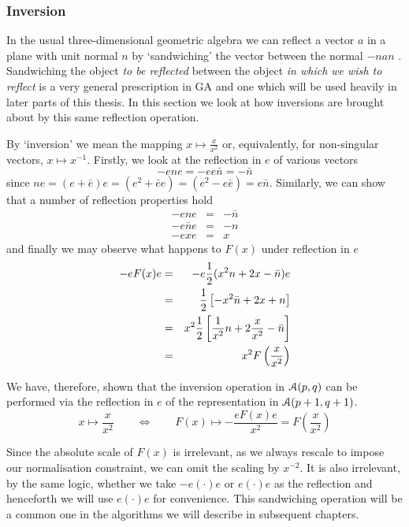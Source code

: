 \subsubsection{Inversion}

In the usual three-dimensional geometric algebra we can reflect a vector $a$
in a plane with unit normal $n$ by `sandwiching' the vector between the
normal $-nan$ \cite{IJCV98}. Sandwiching the object \emph{to be reflected}
between the object \emph{in which we wish to reflect} is a very general
prescription in GA and one which will be used heavily in later parts of this
thesis.  In this section we look at how inversions are brought about by this
same reflection operation.

By `inversion' we mean the mapping $x \mapsto \frac{x}{x^2}$ or,
equivalently, for non-singular vectors, $x \mapsto x^{-1}$. Firstly, we look 
at the reflection in $e$ of various vectors
%
\[ -ene  = -ee\bar{n} = -\bar{n} \] 
since $ne = (e+\bar{e})e=(e^2+\bar{e}e)= (e^2 - e\bar{e}) = e\bar{n}$. 
Similarly, we can show that a number of reflection properties hold
%
\begin{eqnarray} -ene & = &  -\bar{n}  \\ -e\bar{n}e & = &  -{n}  \\ -exe & = &
x \end{eqnarray}
%
and finally we may observe what happens to $F(x)$ under reflection in $e$
%
\begin{eqnarray} -eF(x)e & = &  -e\frac{1}{2}(x^2n + 2x - \bar{n})e  \nonumber \\ & = &
\frac{1}{2}\left[-x^2\bar{n} + 2x + n\right] \nonumber \\ & = &  x^2\frac{1}{2}\left[
\frac{1}{x^2}n + 2\frac{x}{x^2} - \bar{n}\right] \nonumber \\ & = &  x^2
F\left(\frac{x}{x^2}\right) \end{eqnarray}
%

We have, therefore, shown that the inversion operation in ${\mathcal{A}}(p,q)$ can be
performed via the reflection in $e$ of the representation in ${\mathcal{A}}(p+1,q+1)$.
 \begin{equation} x \mapsto \frac{x}{x^2} \qquad \Leftrightarrow \qquad F(x) \mapsto
 -\frac{eF(x)e}{x^2} = F\left(\frac{x}{x^2}\right) \end{equation}
%

Since the absolute scale of $F(x)$ is irrelevant, as we always rescale to
impose our normalisation constraint, we can omit the scaling by $x^{-2}$.  It
is also irrelevant, by the same logic, whether we take $-e(\cdot)e$ or
$e(\cdot)e$ as the reflection and henceforth we will use $e(\cdot)e$ for
convenience. This sandwiching operation will be a common one in the algorithms
we will describe in subsequent chapters.

